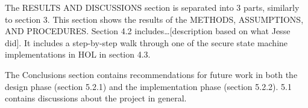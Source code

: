 The RESULTS AND DISCUSSIONS section is separated into 3 parts, similarly to
section 3. This section shows the results of the METHODS, ASSUMPTIONS, AND
PROCEDURES. Section 4.2 includes…[description based on what Jesse did]. It
includes a step-by-step walk through one of the secure state machine
implementations in HOL in section 4.3.

The Conclusions section contains recommendations for future work in both the
design phase (section 5.2.1) and the implementation phase (section 5.2.2).
5.1 contains discussions about the project in general.